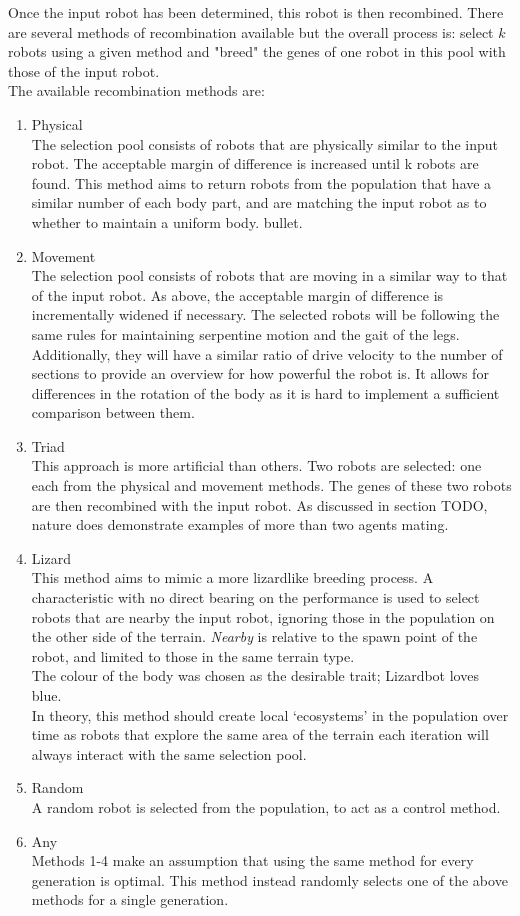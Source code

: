 \documentclass{article}
\begin{document}
Once the input robot has been determined, this robot is then recombined. There are several methods of recombination available but the overall process is: select $k$ robots using a given method and "breed" the genes of one robot in this pool with those of the input robot.\\
The available recombination methods are:
\begin{enumerate}
  \item Physical\\
The selection pool consists of robots that are physically similar to the input robot. The acceptable margin of difference is increased until k robots are found. This method aims to return robots from the population that have a similar number of each body part, and are matching the input robot as to whether to maintain a uniform body.  bullet.
  \item Movement\\
The selection pool consists of robots that are moving in a similar way to that of the input robot. As above, the acceptable margin of difference is incrementally widened if necessary. The selected robots will be following the same rules for maintaining serpentine motion and the gait of the legs. Additionally, they will have a similar ratio of drive velocity to the number of sections to provide an overview for how powerful the robot is. It allows for differences in the rotation of the body as it is hard to implement a sufficient comparison between them. 
	\item Triad\\
This approach is more artificial than others. Two robots are selected: one each from the physical and movement methods. The genes of these two robots are then recombined with the input robot. As discussed in section TODO, nature does demonstrate examples of more than two agents mating.
	\item Lizard\\
This method aims to mimic a more lizardlike breeding process. A characteristic with no direct bearing on the performance is used to select robots that are nearby the input robot, ignoring those in the population on the other side of the terrain. \textit{Nearby} is relative to the spawn point of the robot, and limited to those in the same terrain type. \\
The colour of the body was chosen as the desirable trait; Lizardbot loves blue.\\
In theory, this method should create local ‘ecosystems’ in the population over time as robots that explore the same area of the terrain each iteration will always interact with the same selection pool. 
	\item Random\\
A random robot is selected from the population, to act as a control method.
	\item Any\\
Methods 1-4 make an assumption that using the same method for every generation is optimal. This method instead randomly selects one of the above methods for a single generation.
\end{enumerate}
\end{document}
